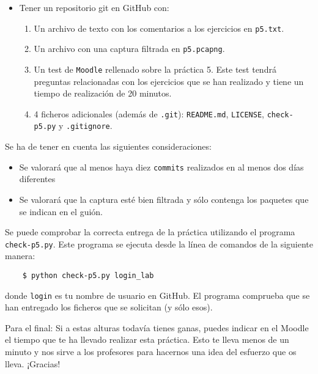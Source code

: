 \documentclass[11pt,a4paper]{article}
\begin{document}
\begin{itemize}
  \item Tener un repositorio git en GitHub con:
  \begin{enumerate}
    \item Un archivo de texto con los comentarios a los ejercicios en \texttt{p5.txt}.
    \item Un archivo con una captura filtrada en \texttt{p5.pcapng}.
    \item Un test de \texttt{Moodle} rellenado sobre la práctica 5. Este test tendrá preguntas relacionadas con los ejercicios que se han realizado y tiene un tiempo de realización de 20 minutos.
    \item 4 ficheros adicionales (además de \texttt{.git}): \texttt{README.md}, \texttt{LICENSE}, \texttt{check-p5.py} y \texttt{.gitignore}.
  \end{enumerate}
\end{itemize}

Se ha de tener en cuenta las siguientes consideraciones:
\begin{itemize}
  \item Se valorará que al menos haya diez \texttt{commits} realizados en al menos dos días diferentes
  \item Se valorará que la captura esté bien filtrada y sólo contenga los paquetes que se indican en el guión.
\end{itemize}

Se puede comprobar la correcta entrega de la práctica utilizando el programa \texttt{check-p5.py}. Este programa se ejecuta desde la línea de comandos de la siguiente manera:
\begin{verbatim}
	$ python check-p5.py login_lab
\end{verbatim}


donde \texttt{login} es tu nombre de usuario en GitHub. El programa comprueba que se han entregado los ficheros que se solicitan (y sólo esos). 


\vspace{1cm}

\footnotesize{Para el final: Si a estas alturas todavía tienes ganas, puedes indicar en el Moodle el tiempo que te ha llevado realizar esta práctica. Esto te lleva menos de un minuto y nos sirve a los profesores para hacernos una idea del esfuerzo que os lleva. ¡Gracias!}
\end{document}
